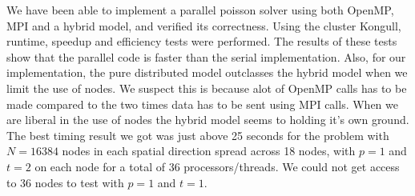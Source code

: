 We have been able to implement a parallel poisson solver using both OpenMP, MPI and a hybrid model, and verified its correctness. Using the cluster Kongull, runtime, speedup and efficiency tests were performed. The results of these tests show that the parallel code is faster than the serial implementation. Also, for our implementation, the pure distributed model outclasses the hybrid model when we limit the use of nodes. We suspect this is because alot of OpenMP calls has to be made compared to the two times data has to be sent using MPI calls. When we are liberal in the use of nodes the hybrid model seems to holding it's own ground. The best timing result we got was just above 25 seconds for the problem with $N=16384$ nodes in each spatial direction spread across 18 nodes, with $p=1$ and $t=2$ on each node for a total of 36 processors/threads. We could not get access to 36 nodes to test with $p=1$ and $t=1$. 